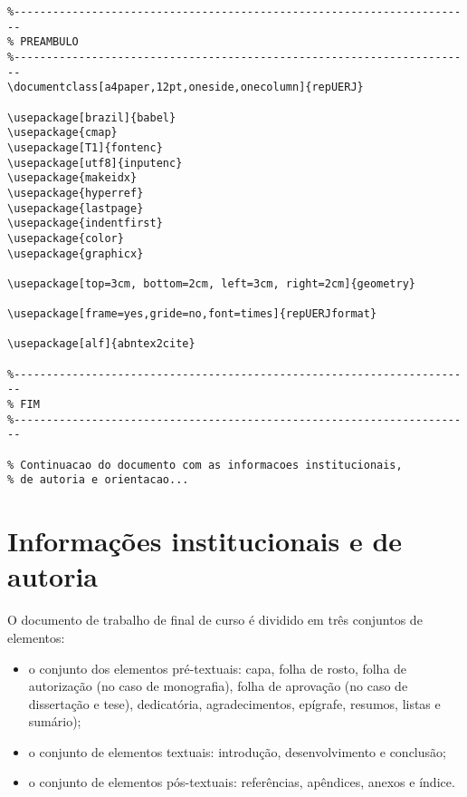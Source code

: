 \documentclass[a4paper,12pt,oneside,onecolumn]{article}
\begin{document}
\begin{verbatim}
%-----------------------------------------------------------------------
% PREAMBULO
%-----------------------------------------------------------------------
\documentclass[a4paper,12pt,oneside,onecolumn]{repUERJ}

\usepackage[brazil]{babel}
\usepackage{cmap}
\usepackage[T1]{fontenc}
\usepackage[utf8]{inputenc}
\usepackage{makeidx}
\usepackage{hyperref}
\usepackage{lastpage}
\usepackage{indentfirst}
\usepackage{color}
\usepackage{graphicx}

\usepackage[top=3cm, bottom=2cm, left=3cm, right=2cm]{geometry}

\usepackage[frame=yes,gride=no,font=times]{repUERJformat}

\usepackage[alf]{abntex2cite}

%-----------------------------------------------------------------------
% FIM
%-----------------------------------------------------------------------

% Continuacao do documento com as informacoes institucionais, 
% de autoria e orientacao...
\end{verbatim}

\section{Informações institucionais e de autoria}

O documento de trabalho de final de curso é dividido em três conjuntos de elementos:

\begin{itemize}
  \item o conjunto dos elementos pré-textuais: capa, folha de rosto, folha de autorização (no caso de monografia), folha de aprovação (no caso de dissertação e tese), dedicatória, agradecimentos, epígrafe, resumos, listas e sumário);
  \item o conjunto de elementos textuais: introdução, desenvolvimento e conclusão;
  \item o conjunto de elementos pós-textuais: referências, apêndices, anexos e índice.\\
\end{itemize}
\end{document}
